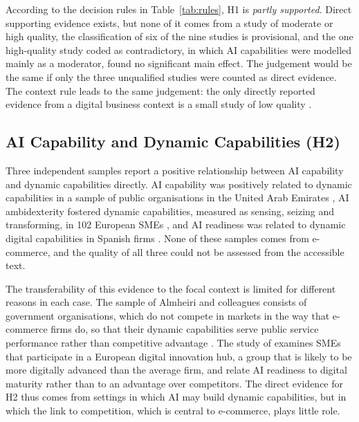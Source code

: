 According to the decision rules in Table~\ref{tab:rules}, H1 is \textit{partly supported}. Direct supporting evidence exists, but none of it comes from a study of moderate or high quality, the classification of six of the nine studies is provisional, and the one high-quality study coded as contradictory, in which AI capabilities were modelled mainly as a moderator, found no significant main effect. The judgement would be the same if only the three unqualified studies were counted as direct evidence. The context rule leads to the same judgement: the only directly reported evidence from a digital business context is a small study of low quality \parencite{firmansyah2025}.

\subsection{AI Capability and Dynamic Capabilities (H2)}
\label{sec:h2}

Three independent samples report a positive relationship between AI capability and dynamic capabilities directly. AI capability was positively related to dynamic capabilities in a sample of public organisations in the United Arab Emirates \parencite{almheiri2024, almheiri2025}, AI ambidexterity fostered dynamic capabilities, measured as sensing, seizing and transforming, in 102 European SMEs \parencite{fano2025}, and AI readiness was related to dynamic digital capabilities in Spanish firms \parencite{neirafernandez2026}. None of these samples comes from e-commerce, and the quality of all three could not be assessed from the accessible text.

The transferability of this evidence to the focal context is limited for different reasons in each case. The sample of Almheiri and colleagues consists of government organisations, which do not compete in markets in the way that e-commerce firms do, so that their dynamic capabilities serve public service performance rather than competitive advantage \parencite{almheiri2024, almheiri2025}. The study of \textcite{fano2025} examines SMEs that participate in a European digital innovation hub, a group that is likely to be more digitally advanced than the average firm, and \textcite{neirafernandez2026} relate AI readiness to digital maturity rather than to an advantage over competitors. The direct evidence for H2 thus comes from settings in which AI may build dynamic capabilities, but in which the link to competition, which is central to e-commerce, plays little role.

